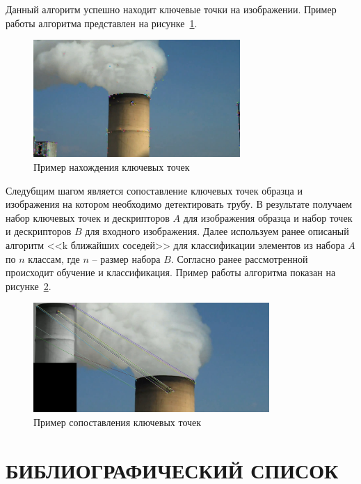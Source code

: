 \documentclass[14pt, a4paper]{extreport}
\begin{document}
	Данный алгоритм успешно находит ключевые точки на изображении. Пример работы алгоритма представлен на рисунке~\ref{fig:keypoints}.
	\begin{figure}[h!]
		\centering
		\includegraphics[width = 0.7\textwidth]{image/chapter_2/keypoints}	
		\caption{Пример нахождения ключевых точек}
		\label{fig:keypoints}
	\end{figure}
	
	Следубщим шагом является сопоставление ключевых точек образца и изображения на котором необходимо детектировать трубу. В результате получаем набор ключевых точек и дескрипторов $A$ для изображения образца и набор точек и дескрипторов $B$ для входного изображения. Далее используем ранее описаный алгоритм <<k ближайших соседей>> для классификации элементов из набора $A$ по $n$ классам, где $n$ -- размер набора $B$. Согласно ранее рассмотренной происходит обучение и классификация. Пример работы алгоритма показан на рисунке~\ref{fig:match1}.
	\begin{figure}[h!]
		\centering
		\includegraphics[width = 0.8\textwidth]{image/chapter_2/match1}	
		\caption{Пример сопоставления ключевых точек}
		\label{fig:match1}
	\end{figure}

\chapter*{БИБЛИОГРАФИЧЕСКИЙ СПИСОК}
\end{document}
